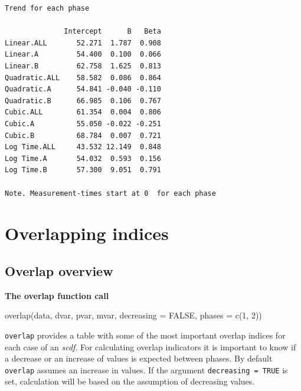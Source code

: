 \documentclass[
  letterpaper,
  DIV=11,
  numbers=noendperiod]{scrreprt}
\begin{document}
\begin{verbatim}
Trend for each phase

              Intercept      B   Beta
Linear.ALL       52.271  1.787  0.908
Linear.A         54.400  0.100  0.066
Linear.B         62.758  1.625  0.813
Quadratic.ALL    58.582  0.086  0.864
Quadratic.A      54.841 -0.040 -0.110
Quadratic.B      66.985  0.106  0.767
Cubic.ALL        61.354  0.004  0.806
Cubic.A          55.050 -0.022 -0.251
Cubic.B          68.784  0.007  0.721
Log Time.ALL     43.532 12.149  0.848
Log Time.A       54.032  0.593  0.156
Log Time.B       57.300  9.051  0.791

Note. Measurement-times start at 0  for each phase
\end{verbatim}

\hypertarget{overlapping-indices}{%
\chapter{Overlapping indices}\label{overlapping-indices}}

\hypertarget{overlap-overview}{%
\section{Overlap overview}\label{overlap-overview}}

\begin{tcolorbox}[enhanced jigsaw, breakable, rightrule=.15mm, bottomrule=.15mm, arc=.35mm, colback=white, colframe=quarto-callout-tip-color-frame, opacityback=0, leftrule=.75mm, toprule=.15mm, left=2mm]
\begin{minipage}[t]{5.5mm}
\textcolor{quarto-callout-tip-color}{\faLightbulb}
\end{minipage}%
\begin{minipage}[t]{\textwidth - 5.5mm}

\textbf{The overlap function call}\vspace{2mm}

overlap(data, dvar, pvar, mvar, decreasing = FALSE, phases = c(1, 2))

\end{minipage}%
\end{tcolorbox}

\texttt{overlap} provides a table with some of the most important
overlap indices for each case of an \emph{scdf}. For calculating overlap
indicators it is important to know if a decrease or an increase of
values is expected between phases. By default \texttt{overlap} assumes
an increase in values. If the argument \texttt{decreasing\ =\ TRUE} is
set, calculation will be based on the assumption of decreasing values.
\end{document}
